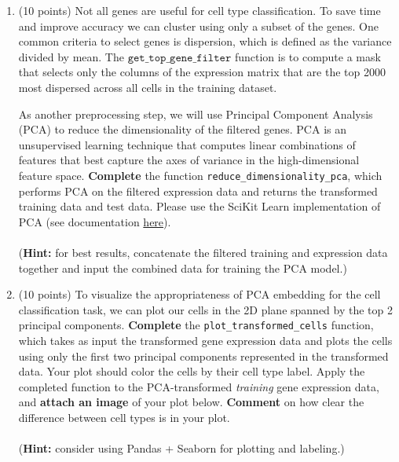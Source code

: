 \begin{enumerate}
\item (10 points) Not all genes are useful for cell type classification. To save time and improve accuracy we can cluster using only a subset of the genes. One common criteria to select genes is dispersion, which is defined as the variance divided by mean. The $\texttt{get\_top\_gene\_filter}$ function is to compute a mask that selects only the columns of the expression matrix that are the top 2000 most dispersed across all cells in the training dataset.


As another preprocessing step, we will use Principal Component Analysis (PCA) to reduce the dimensionality of the filtered genes. PCA is an unsupervised learning technique that computes linear combinations of features that best capture the axes of variance in the high-dimensional feature space. \textbf{Complete} the function \texttt{reduce\_dimensionality\_pca}, which performs PCA on the filtered expression data and returns the transformed training data and test data. Please use the SciKit Learn implementation of PCA (see documentation \href{https://scikit-learn.org/stable/modules/generated/sklearn.decomposition.PCA.html}{here}).
\\\\
(\textbf{Hint:} for best results, concatenate the filtered training and expression data together and input the combined data for training the PCA model.)

\item (10 points) 
To visualize the appropriateness of PCA embedding for the cell classification task, we can plot our cells in the 2D plane spanned by the top 2 principal components. \textbf{Complete} the \texttt{plot\_transformed\_cells} function, which takes as input the transformed gene expression data and plots the cells using only the first two principal components represented in the transformed data. Your plot should color the cells by their cell type label. Apply the completed function to the PCA-transformed \textit{training} gene expression data, and \textbf{attach an image} of your plot below. \textbf{Comment} on how clear the difference between cell types is in your plot.
\\\\
(\textbf{Hint:} consider using Pandas + Seaborn for plotting and labeling.)

\begin{solution}




\end{solution}
\end{enumerate}
